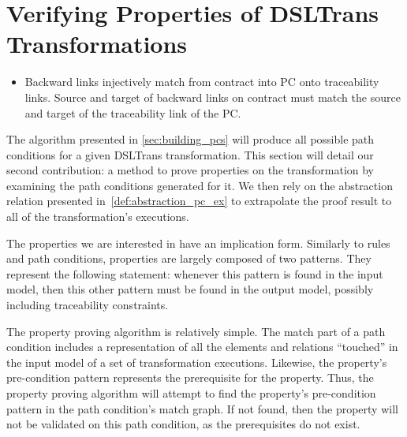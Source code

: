 \section{Verifying Properties of DSLTrans Transformations}
\label{sec:verif_dsltrans_props}



\begin{itemize}
\item Backward links injectively match from contract into PC onto traceability links. Source and target of backward links on contract must match the source and target of the traceability link of the PC.
\end{itemize}

The algorithm presented in \cref{sec:building_pcs} will produce all possible
path conditions for a given DSLTrans transformation. This section will detail
our second contribution: a method to prove properties on the transformation by
examining the path conditions generated for it. We then rely on the abstraction
relation presented in~\cref{def:abstraction_pc_ex} to extrapolate the proof
result to all of the transformation's executions.

The properties we are interested in have an implication form. Similarly to rules and path conditions, properties are largely composed of two patterns. They represent the following statement: whenever this pattern is found in the input model, then
this other pattern must be found in the output model, possibly including traceability constraints.

The property proving algorithm is relatively simple. The match part of a path condition
includes a representation of all the elements and relations ``touched'' in the input model of a set of transformation executions. Likewise, the property's pre-condition pattern represents the prerequisite for the property. Thus, the
property proving algorithm will attempt to find the property's pre-condition pattern in the path condition's match graph. If not found, then the property will not be validated on this path condition, as the prerequisites do not exist.

